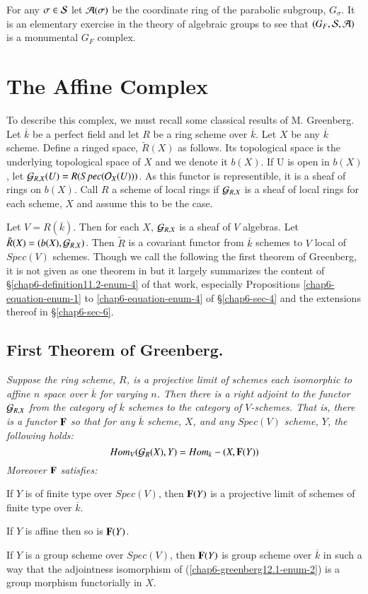 For any $\sigma \in \mathcal{S}$ let $\mathcal{A}(\sigma)$ be the coordinate ring of the parabolic subgroup, $G_{\sigma}$. It is an elementary exercise in the theory of algebraic groups to see that $(G_{F}, \mathcal{S}, \mathcal{A})$ is a monumental $G_{F}$ complex. 

\section*{The Affine Complex}
To describe this complex, we must recall some classical results of M. Greenberg. Let $\overline{k}$ be a perfect field and let $R$ be a ring scheme over $\overline{k}$. Let $X$ be any $\overline{k}$ scheme. Define a ringed space, $\tilde{R}(X)$ as follows. Its topological space is the underlying topological space of $X$ and we denote it $b(X)$. If U is open in $b(X)$, let $\mathcal{G}_{R, X}(U)= R(Spec(\mathcal{O}_{X}(U)))$. As this functor is representible, it is a sheaf of rings on $b(X)$. Call $R$ a scheme of local rings if $\mathcal{G}_{R, X}$ is a sheaf of local rings for each scheme, $X$ and assume this to be the case. 

Let $V=R(\overline{k})$. Then for each $X$, $\mathcal{G}_{R, X}$ is a sheaf of $V$ algebras. Let $\tilde{R}(X) = (b(X), \mathcal{G}_{R, X})$. Then $\tilde{R}$ is a covariant functor from  $\overline{k}$ schemes to $V$ local of $Spec(V)$ schemes. Though we call the following the first theorem of Greenberg, it is not given as one theorem in \cite{chap6-keyMG-I} but it largely summarizes the content of \S\ref{chap6-definition11.2-enum-4} of that work, especially Propositions \ref{chap6-equation-enum-1} to \ref{chap6-equation-enum-4} of \S \ref{chap6-sec-4} and the extensions thereof in
\S\ref{chap6-sec-6}.

\subsection{First Theorem of Greenberg.}\label{chap6-subsec-12.1}
\textit{Suppose the ring scheme, $R$, is a projective limit of schemes each isomorphic to affine $n$ space over $\overline{k}$ for varying $n$. Then there is a right adjoint to the functor $\mathcal{G}_{R, X}$ from the category of $\overline{k}$ schemes to the category of $V$-schemes. That is, there is a functor $\mathbf{F}$ so that for any $\overline{k}$ scheme, $X$, and any $Spec(V)$ scheme, $Y$, the following holds:
$$
Hom_{V}(\mathcal{G}_{R}(X), Y) = Hom_{k}-(X, \mathbf{F}(Y))
$$
Moreover $\mathbf{F}$ satisfies:}
\begin{enumerate}[(1)]
{\it
\item If $Y$ is of finite type over $Spec(V)$, then $\mathbf{F}(Y)$ is a projective limit of schemes of finite type over $\overline{k}$.\label{chap6-greenberg12.1-enum-1}

\item If $Y$ is affine then so is $\mathbf{F}(Y)$.\label{chap6-greenberg12.1-enum-2}

\item If $Y$ is a group scheme over $Spec(V)$, then $\mathbf{F}(Y)$ is group scheme over $\overline{k}$ in such a way that the adjointness isomorphism of (\ref{chap6-greenberg12.1-enum-2}) is a group morphism functorially in $X$.\label{chap6-greenberg12.1-enum-3}}
\end{enumerate} 

